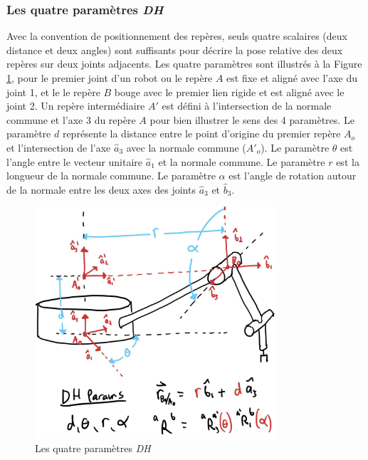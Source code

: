 
\subsubsection{Les quatre paramètres \textit{DH} }
Avec la convention de positionnement des repères, seuls quatre scalaires (deux distance et deux angles) sont suffisants pour décrire la pose relative des deux repères sur deux joints adjacents. Les quatre paramètres sont illustrés à la Figure \ref{fig:dh2}, pour le premier joint d'un robot ou le repère $A$ est fixe et aligné avec l'axe du joint 1, et le le repère $B$ bouge avec le premier lien rigide et est aligné avec le joint 2. Un repère intermédiaire $A'$ est défini à l'intersection de la normale commune et l'axe 3 du repère $A$ pour bien illustrer le sens des 4 paramètres. Le paramètre $d$ représente la distance entre le point d'origine du premier repère $A_o$ et l'intersection de l'axe $\hat{a}_3$ avec la normale commune ($A'_o$).  Le paramètre $\theta$ est l'angle entre le vecteur unitaire $\hat{a}_1$ et la normale commune. Le paramètre $r$ est la longueur de la normale commune. Le paramètre $\alpha$ est l'angle de rotation autour de la normale entre les deux axes des joints $\hat{a}_3$ et $\hat{b}_3$.
\begin{figure}[H]
	\centering
		\includegraphics[width=0.80\textwidth]{fig/dh2.jpg}
	\caption{Les quatre paramètres \textit{DH}}
	\label{fig:dh2}
\end{figure}

